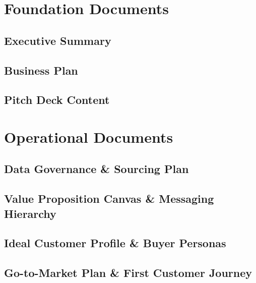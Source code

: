 \documentclass[11pt,a4paper]{book}
\begin{document}
\tableofcontents
\newpage

\part{Foundation Documents}

\chapter{Executive Summary}
\label{chap:executive-summary}


\chapter{Business Plan}
\label{chap:business-plan}


\chapter{Pitch Deck Content}
\label{chap:pitch-deck}


\part{Operational Documents}

\chapter{Data Governance \& Sourcing Plan}
\label{chap:data-governance}


\chapter{Value Proposition Canvas \& Messaging Hierarchy}
\label{chap:value-proposition}


\chapter{Ideal Customer Profile \& Buyer Personas}
\label{chap:customer-personas}


\chapter{Go-to-Market Plan \& First Customer Journey}
\label{chap:go-to-market}

\end{document}
